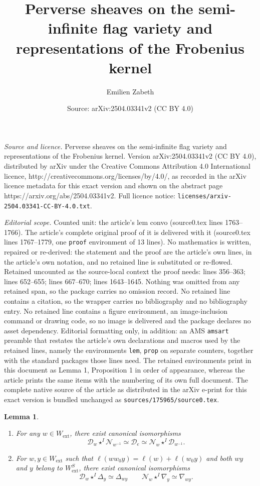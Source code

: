 \documentclass[10pt,a4paper]{amsart}
\title{Perverse sheaves on the semi-infinite flag variety and representations of the Frobenius kernel}
\author{Emilien Zabeth}
\date{Source: arXiv:2504.03341v2 (CC BY 4.0)}
\newtheorem{lem}{Lemma}
\begin{document}
\maketitle

\noindent\emph{Source and licence.} Perverse sheaves on the semi-infinite flag variety and representations of the Frobenius kernel. Version arXiv:2504.03341v2 (CC BY 4.0), distributed by arXiv under the Creative Commons Attribution 4.0 International licence, http://creativecommons.org/licenses/by/4.0/, as recorded in the arXiv licence metadata for this exact version and shown on the abstract page https://arxiv.org/abs/2504.03341v2. Full licence notice: \texttt{licenses/arxiv-2504.03341-CC-BY-4.0.txt}.\par\smallskip

\noindent\textit{Editorial scope.} Counted unit: the article's lem convo (source0.tex lines 1763--1766). The article's complete original proof of it is delivered with it (source0.tex lines 1767--1779, one \texttt{proof} environment of 13 lines). No mathematics is written, repaired or re-derived: the statement and the proof are the article's own lines, in the article's own notation, and no retained line is substituted or re-flowed.  Retained uncounted as the source-local context the proof needs: lines 356--363; lines 652--655; lines 667--670; lines 1643--1645.  Nothing was omitted from any retained span, so the package carries no omission record.  No retained line contains a citation, so the wrapper carries no bibliography and no bibliography entry.  No retained line contains a figure environment, an image-inclusion command or drawing code, so no image is delivered and the package declares no asset dependency.  Editorial formatting only, in addition: an AMS \texttt{amsart} preamble that restates the article's own declarations and macros used by the retained lines, namely the environments \texttt{lem}, \texttt{prop} on separate counters, together with the standard packages those lines need.  The retained environments print in this document as Lemma 1, Proposition 1 in order of appearance, whereas the article prints the same items with the numbering of its own full document.  The complete native source of the article as distributed in the arXiv e-print for this exact version is bundled unchanged as \texttt{sources/175965/source0.tex}.
	\begin{lem}\label{lem conv standard}
 \begin{enumerate}
     \item For any $w\in W_\mathrm{ext}$, there exist canonical isomorphisms
     $$\mathcal{D}_w\star^I\mathcal{N}_{w^{-1}}\simeq \mathcal{D}_e\simeq \mathcal{N}_w\star^I\mathcal{D}_{w^{-1}}. $$
     \item For $w,y\in W_\mathrm{ext}$ such that $\ell(ww_0y)=\ell(w)+\ell(w_0y)$ and both $wy$ and $y$ belong to $W_\mathrm{ext}^S$, there exist canonical isomorphisms
		$$\mathcal{D}_w\star^I\Delta_y\simeq\Delta_{wy}\qquad \mathcal{N}_w\star^I\nabla_y\simeq\nabla_{wy}.$$
 \end{enumerate}
	\end{lem}
\end{document}
